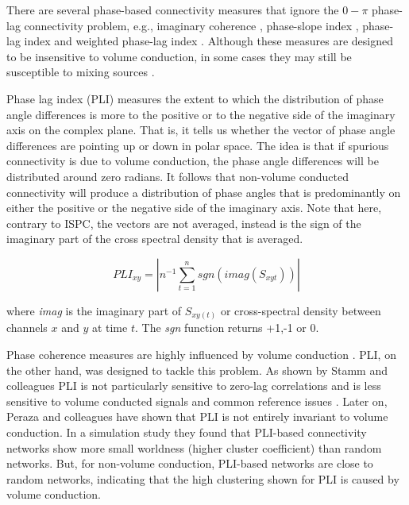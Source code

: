\documentclass[11pt, onecolumn]{article}
\begin{document}
There are several phase-based connectivity measures that ignore the $0-\pi$ phase-lag connectivity problem, e.g., imaginary coherence \citep{nolte2004identifying}, phase-slope index \citep{nolte2008robustly}, phase-lag index \citep{stam2007phase} and weighted phase-lag index \cite{vinck2011improved}. Although these measures are designed to be insensitive to volume conduction, in
some cases they may still be susceptible to mixing sources \citep{peraza2012volume}.

Phase lag index (PLI) measures the extent to which the distribution of phase angle differences is more to the positive or to the negative side of the imaginary axis on the complex plane. That is, it tells us whether the vector of phase angle differences are pointing up or down in polar space. The idea is that if spurious connectivity is due to volume conduction, the phase angle differences will be distributed around zero radians. It follows that non-volume conducted connectivity will produce a distribution of phase angles that is predominantly on either the positive or the negative side of the imaginary axis. Note that here, contrary to ISPC, the vectors are not averaged, instead is the sign of the imaginary part of the cross spectral density that is averaged.

\begin{equation}
PLI_{xy} = |n^{-1} \sum_{t=1}^{n}sgn(imag(S_{xyt}))|
\label{eq:pli}
\end{equation}

where \textit{imag} is the imaginary part of $S_{xy(t)}$ or cross-spectral density between channels $x$ and $y$ at time $t$.
The \textit{sgn} function returns +1,-1 or 0. %

Phase coherence measures are highly influenced by volume conduction  \citep{mormann2000mean}. 
PLI, on the other hand, was designed to tackle this problem. As shown by Stamm and colleagues PLI is not particularly sensitive to zero-lag correlations and is less sensitive to volume conducted signals and common reference issues \cite{stam2007phase}.
Later on, Peraza and colleagues \citep{peraza2012volume} have shown  that PLI is not entirely invariant to volume conduction. In a simulation study they found that PLI-based connectivity networks show more small worldness (higher cluster coefficient) than random networks. But, for non-volume conduction, PLI-based networks are close to random networks, indicating that the high clustering shown for PLI is caused by volume conduction. 
\end{document}
